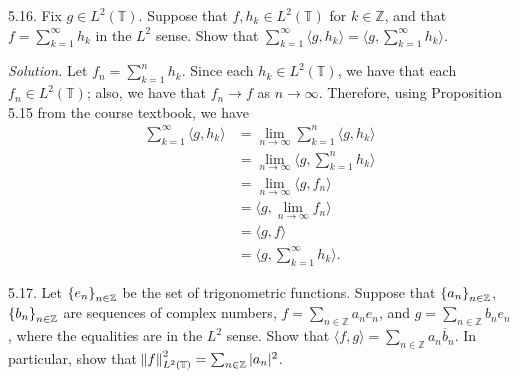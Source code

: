 \documentclass{article}
\newcommand{\T}{\mathbb{T}}
\newcommand{\Z}{\mathbb{Z}}
\begin{document}
\newpage

5.16. Fix $g \in L^2(\T)$. Suppose that $f, h_k \in L^2(\T)$ for $k \in \Z$,
and that $f = \sum_{k = 1}^\infty h_k$ in the $L^2$ sense. Show that
$\sum_{k = 1}^\infty \langle g, h_k \rangle = \langle g, \sum_{k = 1}^\infty h_k \rangle$.

\textit{Solution.}
Let $f_n = \sum_{k = 1}^n h_k$. Since each $h_k \in L^2(\T)$, we
have that each $f_n \in L^2(\T)$; also, we have that $f_n \to f$ as
$n \to \infty$. Therefore, using Proposition 5.15 from the course textbook,
we have
%
\begin{align*}
    \sum_{k = 1}^\infty \langle g, h_k \rangle
        &= \lim_{n \to \infty} \sum_{k = 1}^n \langle g, h_k \rangle \\
        &= \lim_{n \to \infty} \langle g, \sum_{k = 1}^n h_k \rangle \\
        &= \lim_{n \to \infty} \langle g, f_n \rangle \\
        &= \langle g, \lim_{n \to \infty} f_n \rangle \\
        &= \langle g, f \rangle \\
        &= \langle g, \sum_{k = 1}^\infty h_k \rangle
        .
\end{align*}

\newpage

5.17. Let $\cbr{e_n}_{n \in \Z}$ be the set of trigonometric functions.
Suppose that $\cbr{a_n}_{n \in \Z}$, $\cbr{b_n}_{n \in \Z}$ are sequences
of complex numbers, $f = \sum_{n \in \Z} a_n e_n$, and
$g = \sum_{n \in \Z} b_n e_n$, where the equalities are in the $L^2$ sense.
Show that $\langle f, g \rangle = \sum_{n \in \Z} a_n \overline{b}_n$.
In particular, show that $\norm{f}^2_{L^2(\T)} = \sum_{n \in \Z} |a_n|^2$.
\end{document}
